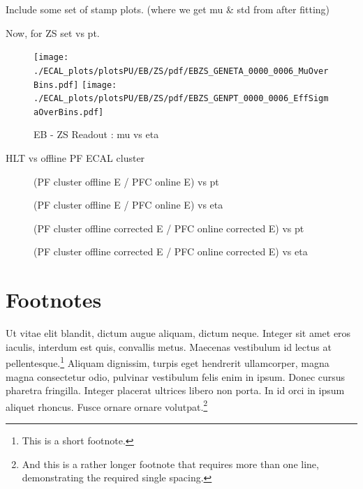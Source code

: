 Include some set of stamp plots. (where we get mu \& std from after fitting)


Now, for ZS set vs pt.
\begin{figure}
\texttt{[image: ./ECAL\_plots/plotsPU/EB/ZS/pdf/EBZS\_GENETA\_0000\_0006\_MuOverBins.pdf]}
\texttt{[image: ./ECAL\_plots/plotsPU/EB/ZS/pdf/EBZS\_GENPT\_0000\_0006\_EffSigmaOverBins.pdf]}
\caption{EB - ZS Readout : mu vs eta}
\end{figure}

HLT vs offline PF ECAL cluster

\begin{figure}
\caption{(PF cluster offline E / PFC online E) vs pt}
\end{figure}
\begin{figure}
\caption{(PF cluster offline E / PFC online E) vs eta}
\end{figure}


\begin{figure}
\caption{(PF cluster offline corrected E / PFC online corrected E) vs pt}
\end{figure}
\begin{figure}
\caption{(PF cluster offline corrected E / PFC online corrected E) vs eta}
\end{figure}

\section{Footnotes}

Ut vitae elit blandit, dictum augue aliquam, dictum neque. Integer sit amet eros
iaculis, interdum est quis, convallis metus. Maecenas vestibulum id lectus at
pellentesque.\footnote{This is a short footnote.} Aliquam dignissim, turpis eget
hendrerit ullamcorper, magna magna consectetur odio, pulvinar vestibulum felis
enim in ipsum. Donec cursus pharetra fringilla. Integer placerat ultrices libero
non porta. In id orci in ipsum aliquet rhoncus. Fusce ornare ornare
volutpat.\footnote{And this is a rather longer footnote that requires more than
one line, demonstrating the required single spacing.}

